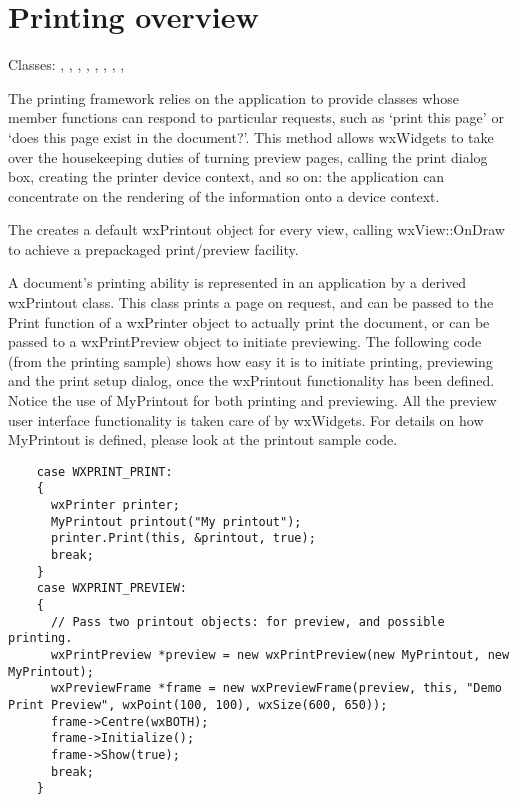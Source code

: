 \section{Printing overview}\label{printingoverview}

Classes: , 
, 
, 
, 
, 
, 
, 
, 

The printing framework relies on the application to provide classes
whose member functions can respond to particular requests, such
as `print this page' or `does this page exist in the document?'.
This method allows wxWidgets to take over the housekeeping duties of
turning preview pages, calling the print dialog box, creating
the printer device context, and so on: the application can concentrate
on the rendering of the information onto a device context.

The  creates a default
wxPrintout object for every view, calling wxView::OnDraw to achieve a
prepackaged print/preview facility.

A document's printing ability is represented in an application by a
derived wxPrintout class. This class prints a page on request, and can
be passed to the Print function of a wxPrinter object to actually print
the document, or can be passed to a wxPrintPreview object to initiate
previewing. The following code (from the printing sample) shows how easy
it is to initiate printing, previewing and the print setup dialog, once the wxPrintout
functionality has been defined. Notice the use of MyPrintout for
both printing and previewing. All the preview user interface functionality
is taken care of by wxWidgets. For details on how MyPrintout is defined,
please look at the printout sample code.

\begin{verbatim}
    case WXPRINT_PRINT:
    {
      wxPrinter printer;
      MyPrintout printout("My printout");
      printer.Print(this, &printout, true);
      break;
    }
    case WXPRINT_PREVIEW:
    {
      // Pass two printout objects: for preview, and possible printing.
      wxPrintPreview *preview = new wxPrintPreview(new MyPrintout, new MyPrintout);
      wxPreviewFrame *frame = new wxPreviewFrame(preview, this, "Demo Print Preview", wxPoint(100, 100), wxSize(600, 650));
      frame->Centre(wxBOTH);
      frame->Initialize();
      frame->Show(true);
      break;
    }
\end{verbatim}

